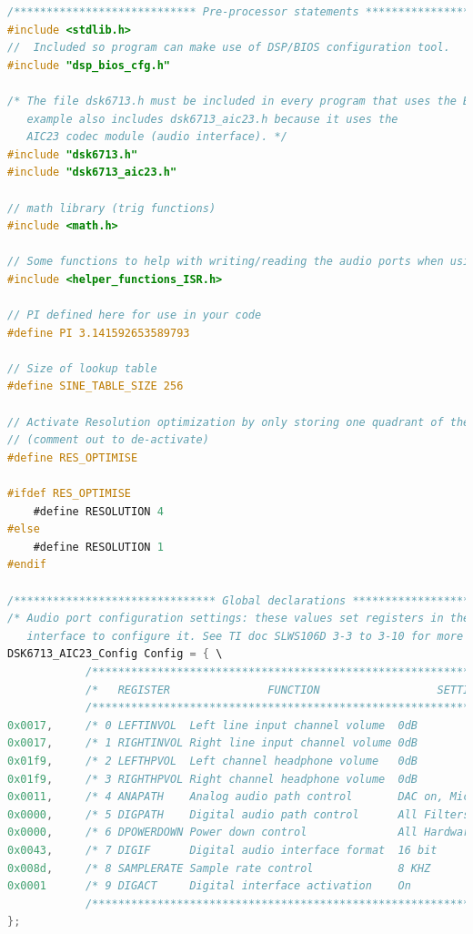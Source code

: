 \documentclass{article}
\begin{document}
\begin{lstlisting}[language=C, caption=C-code to generate interrupt driven rectified sine wave (using a look-up table), label = lst:init_hardware]
/**************************** Pre-processor statements ******************************/
#include <stdlib.h>
//  Included so program can make use of DSP/BIOS configuration tool.  
#include "dsp_bios_cfg.h"

/* The file dsk6713.h must be included in every program that uses the BSL.  This 
   example also includes dsk6713_aic23.h because it uses the 
   AIC23 codec module (audio interface). */
#include "dsk6713.h"
#include "dsk6713_aic23.h"

// math library (trig functions)
#include <math.h>

// Some functions to help with writing/reading the audio ports when using interrupts.
#include <helper_functions_ISR.h>

// PI defined here for use in your code 
#define PI 3.141592653589793

// Size of lookup table
#define SINE_TABLE_SIZE 256

// Activate Resolution optimization by only storing one quadrant of the sine wave 
// (comment out to de-activate)
#define RES_OPTIMISE				

#ifdef RES_OPTIMISE
	#define RESOLUTION 4
#else
	#define RESOLUTION 1
#endif

/******************************* Global declarations ********************************/
/* Audio port configuration settings: these values set registers in the AIC23 audio 
   interface to configure it. See TI doc SLWS106D 3-3 to 3-10 for more info. */
DSK6713_AIC23_Config Config = { \
            /**********************************************************************/
            /*   REGISTER	            FUNCTION			      SETTINGS         */ 
            /**********************************************************************/
0x0017,     /* 0 LEFTINVOL  Left line input channel volume  0dB                   */
0x0017,     /* 1 RIGHTINVOL Right line input channel volume 0dB                   */
0x01f9,     /* 2 LEFTHPVOL  Left channel headphone volume   0dB                   */
0x01f9,     /* 3 RIGHTHPVOL Right channel headphone volume  0dB                   */
0x0011,     /* 4 ANAPATH    Analog audio path control       DAC on, Mic boost 20dB*/
0x0000,     /* 5 DIGPATH    Digital audio path control      All Filters off       */
0x0000,     /* 6 DPOWERDOWN Power down control              All Hardware on       */
0x0043,     /* 7 DIGIF      Digital audio interface format  16 bit                */
0x008d,     /* 8 SAMPLERATE Sample rate control             8 KHZ                 */
0x0001      /* 9 DIGACT     Digital interface activation    On                    */
            /**********************************************************************/
};



\end{lstlisting}
\end{document}
